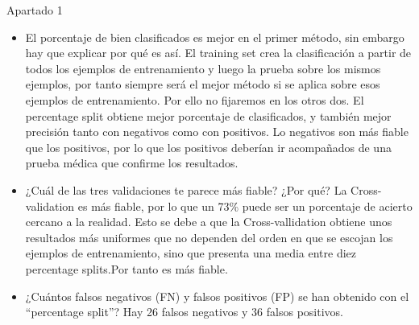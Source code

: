 \documentclass[11pt, a4paper, spanish, openright, twoside]{book}
\begin{document}
\begin{section}{Apartado 1}
\begin{itemize}
		\begin{itemize}
			 \item El porcentaje de bien clasificados es mejor en el primer método, sin embargo hay que explicar por qué es así. El training set crea la clasificación a partir de todos los ejemplos de entrenamiento  y luego la prueba sobre 
			los mismos ejemplos, por tanto siempre será el mejor método si se aplica sobre esos ejemplos de entrenamiento. Por ello no fijaremos en los otros dos. El percentage split obtiene mejor porcentaje de clasificados, 
			y también mejor precisión tanto con negativos como con positivos. Lo negativos son más fiable que los positivos, por lo que los positivos deberían ir acompañados de una prueba médica que confirme los resultados.
			\item  ¿Cuál de las tres validaciones te parece 	más fiable? ¿Por qué? La Cross-validation es más fiable, por lo que un 73\% puede ser un porcentaje de acierto cercano a la realidad. Esto se debe a que la Cross-vallidation obtiene 
			unos resultados más uniformes que no dependen del orden en que se escojan los ejemplos de entrenamiento, sino que presenta una media entre diez percentage splits.Por tanto es más fiable.
			 \item ¿Cuántos falsos negativos (FN) y falsos positivos (FP) se han obtenido con el “percentage split”? Hay 26 falsos negativos y 36 falsos positivos.
		\end{itemize}
	

	\end{itemize}
\end{section}
\end{document}
